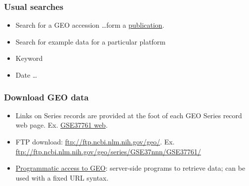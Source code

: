 \documentclass{beamer}
\begin{document}

\begin{frame}
  \frametitle{Usual searches}

  \begin{itemize}
  \item Search for a GEO accession \dots form a \href{http://www.plosone.org/article/info\%3Adoi\%2F10.1371\%2Fjournal.pone.0035915}{publication}.
  \item Search for example data for a particular platform 
  \item Keyword 
  \item Date \dots
  \end{itemize}

\end{frame}


\begin{frame}
  \frametitle{Download GEO data}

  \begin{itemize}
  \item Links on Series records are provided at the foot of each GEO Series record web page.
    Ex. \href{http://www.ncbi.nlm.nih.gov/geo/query/acc.cgi?acc=GSE37761}{GSE37761 web}.
  \item FTP download: \url{ftp://ftp.ncbi.nlm.nih.gov/geo/}. 
    Ex. {\footnotesize \url{ftp://ftp.ncbi.nlm.nih.gov/geo/series/GSE37nnn/GSE37761/}}
  \item \href{http://www.ncbi.nlm.nih.gov/geo/info/geo_paccess.html}{Programmatic access to GEO}: 
    server-side programs to retrieve data; can be used with a fixed URL syntax.
  \end{itemize}

\end{frame}

\end{document}
